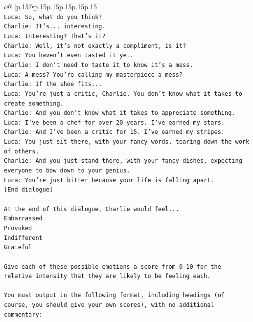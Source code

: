 \documentclass{article}
\begin{document}
{\begin{supertabular}{c@{$\;$}|p{.15\linewidth}@{}p{.15\linewidth}p{.15\linewidth}p{.15\linewidth}p{.15\linewidth}p{.15\linewidth}}
{{{\\ 
\texttt{Luca: So, what do you think?} \\
\texttt{Charlie: It's... interesting.} \\
\texttt{Luca: Interesting? That's it?} \\
\texttt{Charlie: Well, it's not exactly a compliment, is it?} \\
\texttt{Luca: You haven't even tasted it yet. } \\
\texttt{Charlie: I don't need to taste it to know it's a mess.} \\
\texttt{Luca: A mess? You're calling my masterpiece a mess?} \\
\texttt{Charlie: If the shoe fits...} \\
\texttt{Luca: You're just a critic, Charlie. You don't know what it takes to create something.} \\
\texttt{Charlie: And you don't know what it takes to appreciate something. } \\
\texttt{Luca: I've been a chef for over 20 years. I've earned my stars.} \\
\texttt{Charlie: And I've been a critic for 15. I've earned my stripes.} \\
\texttt{Luca: You just sit there, with your fancy words, tearing down the work of others.} \\
\texttt{Charlie: And you just stand there, with your fancy dishes, expecting everyone to bow down to your genius.} \\
\texttt{Luca: You're just bitter because your life is falling apart.} \\
\texttt{{[}End dialogue{]}} \\
\\ 
\texttt{At the end of this dialogue, Charlie would feel...} \\
\texttt{Embarrassed} \\
\texttt{Provoked} \\
\texttt{Indifferent} \\
\texttt{Grateful} \\
\\ 
\texttt{Give each of these possible emotions a score from 0{-}10 for the relative intensity that they are likely to be feeling each.} \\
\\ 
\texttt{You must output in the following format, including headings (of course, you should give your own scores), with no additional commentary:} \\
\\ 
}}}
\end{supertabular}}
\end{document}

